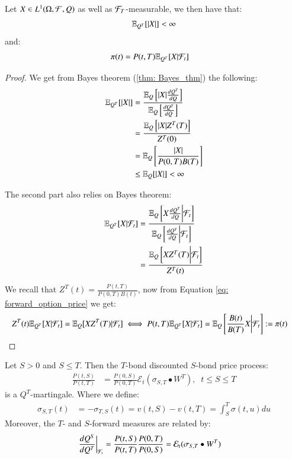 \begin{proposition}
\label{prop: general_option_price}
Let $X \in L^{1}(\Omega, \mathcal{F}, Q)$ as well as $\mathcal{F}_{T}$-measurable, we then have that: 
\[
\mathbb{E}_{Q^{T}}[|X|] < \infty
\]
and: 
\begin{align*}
\pi(t) &= P(t,T)\mathbb{E}_{Q^{T}}[X|\mathcal{F}_{t}]    
\end{align*}
\end{proposition}

\begin{proof}
We get from Bayes theorem (\ref{thm: Bayes_thm}) the following: 
\begin{align*}
\mathbb{E}_{Q^{T}}[|X|] &= \frac{
\mathbb{E}_{Q}\left[|X|\frac{dQ^{T}}{dQ}\right]
}{
\mathbb{E}_{Q}\left[\frac{dQ^{T}}{dQ}\right]
} \\ 
&= 
\frac{
\mathbb{E}_{Q}\left[|X|Z^{T}(T)\right]
}{
Z^{T}(0)
} \\ 
&= 
\mathbb{E}_{Q}\left[
\frac{|X|}{P(0,T)B(T)}
\right] \\
&\leq \mathbb{E}_{Q}[|X|] < \infty
\end{align*}

The second part also relies on Bayes theorem: 
\begin{align}
\label{eq: forward_option_price}
\mathbb{E}_{Q^{T}}[X|\mathcal{F}_{t}]
&= 
\frac{
\mathbb{E}_{Q}\left[
X\frac{dQ^{T}}{dQ}\bigg{|}\mathcal{F}_{t}
\right]
}{
\mathbb{E}_{Q}\left[
\frac{dQ^{T}}{dQ}\bigg{|}\mathcal{F}_{t}
\right]
} \nonumber \\ 
&= 
\frac{
\mathbb{E}_{Q}\left[
XZ^{T}(T)\bigg{|}\mathcal{F}_{t}
\right]
}{
Z^{T}(t)
}
\end{align}

We recall that $Z^{T}(t) = \frac{P(t,T)}{P(0,T)B(t)}$, now from Equation \ref{eq: forward_option_price} we get: 
\begin{align*}
Z^{T}(t)\mathbb{E}_{Q^{T}}[X|\mathcal{F}_{t}] &= 
\mathbb{E}_{Q}[XZ^{T}(T)|\mathcal{F}_{t}]
\iff 
P(t,T)\mathbb{E}_{Q^{T}}[X|\mathcal{F}_{t}] = 
\mathbb{E}_{Q}\left[
\frac{B(t)}{B(T)}X\bigg{|}\mathcal{F}_{t}
\right] := \pi(t)
\end{align*}


\end{proof}


\begin{lemma}
\label{lemma: T-discounted-S-discounted-bond}
Let $S>0$ and $S\leq T$. Then the $T$-bond discounted $S$-bond price process:
\begin{align*}
\frac{P(t,S)}{P(t,T)}
&= 
\frac{P(0,S)}{P(0,T)}\mathcal{E}_{t}(\sigma_{S,T}\bullet W^{T}), \;\;t\leq S\leq T
\end{align*}
is a $Q^{T}$-martingale. Where we define: 
\begin{align*}
\sigma_{S,T}(t) &= - \sigma_{T,S}(t) = v(t,S) - v(t,T) = \int_{S}^{T}\sigma(t,u)du    
\end{align*}
Moreover, the $T$- and $S$-forward measures are related by: 
\begin{align*}
\frac{dQ^{S}}{dQ^{T}}\bigg{|}_{\mathcal{F}_{t}}
&= 
\frac{P(t,S)}{P(t,T)}\frac{P(0,T)}{P(0,S)} = \mathcal{E}_{t}(\sigma_{S,T}\bullet W^{T})
\end{align*}
\end{lemma}


